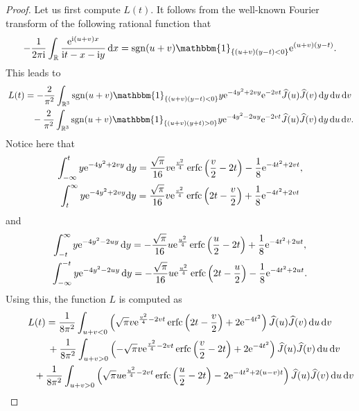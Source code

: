\documentclass[pdftex]{sigma}
\numberwithin{equation}{section}
\newcommand{\erfc}{\operatorname{erfc}}
\newcommand{\R}{{\mathbb R}}
\newcommand{\1}{\chi}
\newcommand{\sgn}{\operatorname{sgn}}
\def\wh{\widehat}
\begin{document}
\begin{proof}
	Let us first compute $L(t)$. It follows from the well-known Fourier transform of the following rational function that
	\begin{gather*}
			-\frac{1}{2\pi {\rm i}}\int_\R \frac{{\rm e}^{{\rm i}(u+v)x}}{{\rm i}t-x-{\rm i}y} \,{\rm d}x =\sgn(u+v) \mathbbm{1}_{ \{ (u+v)(y-t)<0\} } {\rm e}^{(u+v)(y-t)}.
		\end{gather*}
	This leads to
	\begin{gather*}
L(t) =-\frac{2}{\pi^2} \int_{ \R^3 } \sgn(u+v)\mathbbm{1}_{ \{ (u+v)(y-t)<0\} } y {\rm e}^{ -4y^2+2vy } {\rm e}^{-2vt} \wh{J}(u) \wh{J}(v) \,{\rm d}y\,{\rm d}u\,{\rm d}v\\
\hphantom{L(t) =}{}
 -\frac{2}{\pi^2} \int_{ \R^3 } \sgn(u+v) \mathbbm{1}_{ \{ (u+v)(y+t)>0\} } y {\rm e}^{ -4y^2-2uy } {\rm e}^{-2vt} \wh{J}(u) \wh{J}(v) \,{\rm d}y\,{\rm d}u\,{\rm d}v.
\end{gather*}
Notice here that
\begin{gather*}
\int_{-\infty}^t y {\rm e}^{-4y^2+2vy}\,{\rm d}y
			 =\frac{\sqrt{\pi}}{ 16 }v {\rm e}^{ \frac{v^2}{4} } \erfc\left( \frac{v}{2}-2t \right)-\frac18 {\rm e}^{-4t^2+2vt},
			\\
\int_t^\infty y {\rm e}^{-4y^2+2vy} {\rm d}y
=\frac{\sqrt{\pi}}{ 16 }v {\rm e}^{ \frac{v^2}{4} } \erfc\left( 2t-\frac{v}{2} \right)+\frac18 {\rm e}^{-4t^2+2vt}
		\end{gather*}
	and
\begin{gather*}
\int_{-t}^\infty y {\rm e}^{-4y^2-2uy}\,{\rm d}y
=-\frac{\sqrt{\pi}}{ 16 }u {\rm e}^{ \frac{u^2}{4} } \erfc\left( \frac{u}{2}-2t \right)+\frac18 {\rm e}^{-4t^2+2ut},\\
\int_{-\infty}^{-t} y {\rm e}^{-4y^2-2uy}\,{\rm d}y
=-\frac{\sqrt{\pi}}{ 16 }u {\rm e}^{ \frac{u^2}{4} } \erfc\left( 2t-\frac{u}{2} \right)-\frac18 {\rm e}^{-4t^2+2ut}.
		\end{gather*}
	Using this, the function $L$ is computed as
	\begin{gather*}%
			L(t)=\frac{1}{8\pi^2} \int_{ u+v<0 } \left(\sqrt{\pi}v {\rm e}^{ \frac{v^2}{4}-2vt } \erfc\left( 2t-\frac{v}{2} \right)+2 {\rm e}^{-4t^2}\right) \wh{J}(u) \wh{J}(v) \,{\rm d}u\,{\rm d}v
			\\
\hphantom{L(t)=}{}
 +\frac{1}{8\pi^2} \int_{ u+v>0 } \left(-\sqrt{\pi}v {\rm e}^{ \frac{v^2}{4}-2vt } \erfc\left( \frac{v}{2}-2t \right)+2 {\rm e}^{-4t^2}\right) \wh{J}(u) \wh{J}(v) \,{\rm d}u\,{\rm d}v
			\\
\hphantom{L(t)=}{} +\frac{1}{8\pi^2} \int_{ u+v>0 } \left(\sqrt{\pi}u {\rm e}^{ \frac{u^2}{4}-2vt } \erfc\left( \frac{u}{2}-2t \right)-2 {\rm e}^{-4t^2+2(u-v)t}\right) \wh{J}(u) \wh{J}(v) \,{\rm d}u\,{\rm d}v

\end{gather*}
\end{proof}
\end{document}
